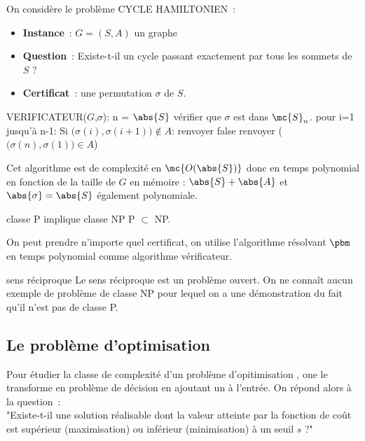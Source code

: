 \begin{adjustwidth}{-3cm}{-3cm}
\begin{exemple}{}{}
    On considère le problème CYCLE HAMILTONIEN~:
    \begin{itemize}
        \item \textbf{Instance}~: $G=(S,A)$ un graphe
        \item \textbf{Question}~: Existe-t-il un cycle passant exactement par tous les sommets de $S$ ?
        \item \textbf{Certificat}~: une permutation $\sigma$ de $S$.
    \end{itemize}
    \begin{lstLNat}
    VERIFICATEUR($G$,$\sigma$):
        n = $\abs{S}$
        vérifier que $\sigma$ est dans $\mc{S}_n$.
        pour i=1 jusqu'à n-1:
            Si $\Big(\sigma(i),\sigma(i+1)\Big) \notin A$:
                renvoyer false
        renvoyer ($\Big(\sigma(n),\sigma(1)\Big) \in A$)
    \end{lstLNat}
    Cet algorithme est de complexité en $\mc{O(\abs{S})}$ donc en temps polynomial en fonction de la taille de $G$ en mémoire : $\abs{S} + \abs{A}$ et $\abs{\sigma} = \abs{S}$ également polynomiale.
\end{exemple}

\begin{proposition}{}{classe P implique classe NP}
    P $\subset$ NP.
\end{proposition}

\begin{demonstration}
    On peut prendre n'importe quel certificat, on utilise l'algorithme résolvant $\pbm$ en temps polynomial comme algorithme vérificateur.
\end{demonstration}

\begin{remarque}{}{sens réciproque}
    Le sens réciproque est un problème ouvert. On ne connaît aucun exemple de problème de classe NP pour lequel on a une démonstration du fait qu'il n'est pas de classe P.
\end{remarque}

\subsection{Le problème d'optimisation}
Pour étudier la classe de complexité d'un problème d'opitimisation , one le transforme en problème de décision en ajoutant un  à l'entrée. On répond alors à la question~:\\
"Existe-t-il une solution réalisable dont la valeur atteinte par la fonction de coût est supérieur (maximisation) ou inférieur (minimisation) à un seuil $s$ ?"\\\\


\end{adjustwidth}
